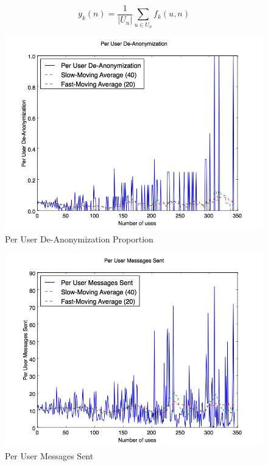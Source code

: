$$ y_k(n) = \frac{1}{|U_n|}\sum_{u \in U_n}{f_k(u, n)} $$

\begin{figure}[H]
\centering
\includegraphics[trim= 0mm 0mm 0mm 0mm, clip, scale=0.5]{./Figures/PerUserDe-Anonymization.jpg}
\caption{Per User De-Anonymization Proportion}
\label{fig:PerUserFBConnect}
\end{figure}

\begin{figure}[H]
\centering
\includegraphics[trim= 0mm 0mm 0mm 0mm, clip, scale=0.5]{./Figures/PerUserMessagesSent.jpg}
\caption{Per User Messages Sent}
\label{fig:PerUserMessagesSent}
\end{figure}

